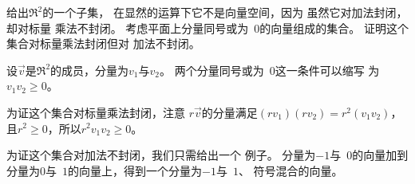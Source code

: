   \item {}给出$\Re^2$的一个子集，
   在显然的运算下它不是向量空间，因为
   虽然它对加法封闭，却对标量
   乘法不封闭。
   考虑平面上分量同号或为~$0$的向量组成的集合。
   证明这个集合对标量乘法封闭但对 
   加法不封闭。
   \begin{answer}
     设$\vec{v}$是$\Re^2$的成员，分量为$v_1$与$v_2$。
     两个分量同号或为~$0$这一条件可以缩写
     为$v_1v_2\geq 0$。

     为证这个集合对标量乘法封闭，注意
     $r\vec{v}$的分量满足$(rv_1)(rv_2)=r^2(v_1v_2)$，
     且$r^2\geq 0$，所以$r^2v_1v_2\geq 0$。

     为证这个集合对加法不封闭，我们只需给出一个
     例子。  
     分量为$-1$与~$0$的向量加到
     分量为$0$与~$1$的向量上，得到一个分量为$-1$与~$1$、
     符号混合的向量。
   \end{answer}


